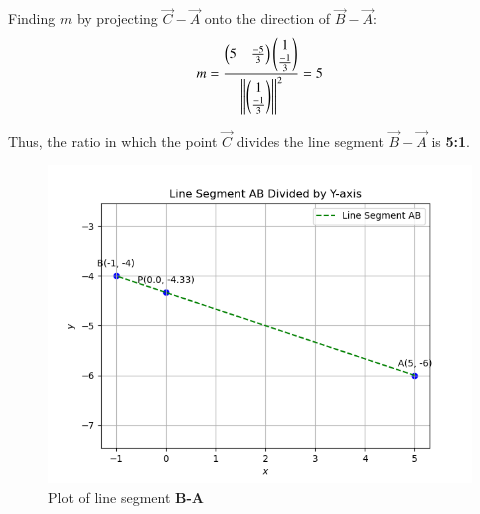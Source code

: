 \documentclass[journal]{IEEEtran}
\begin{document}
Finding $m$ by projecting $\vec{C}-\vec{A}$ onto the direction of $\vec{B}-\vec{A}$:
\begin{align}
    m=\frac{\begin{pmatrix}5 & \frac{-5}{3}\end{pmatrix}\begin{pmatrix}1 \\ \frac{-1}{3}\end{pmatrix}}{\left\lVert\begin{pmatrix}1 \\ \frac{-1}{3}\end{pmatrix}\right\rVert^2}=5
\end{align}

Thus, the ratio in which the point $\vec{C}$ divides the line segment $\vec{B}-\vec{A}$ is \textbf{5:1}. \\

\begin{figure}[h!]
   \centering
   \includegraphics[width=0.7\linewidth]{figs/plot.png}
   \caption{Plot of line segment \textbf{B-A}}
   \label{}
\end{figure}
\end{document}

